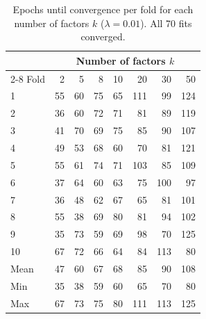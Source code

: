 	\begin{table}[ht]
		\centering
		\caption{Epochs until convergence per fold for each number of factors $k$
			($\lambda = 0.01$). All 70 fits converged.}
		\label{tab:fold-epochs}
		\begin{tabular}{@{}lrrrrrrr@{}}
			\toprule
			& \multicolumn{7}{c}{Number of factors $k$} \\
			\cmidrule(l){2-8}
			Fold & 2 & 5 & 8 & 10 & 20 & 30 & 50 \\
			\midrule
			1  &  55 &  60 & 75 & 65 & 111 &  99 & 124 \\
			2  &  36 &  60 & 72 & 71 &  81 &  89 & 119 \\
			3  &  41 &  70 & 69 & 75 &  85 &  90 & 107 \\
			4  &  49 &  53 & 68 & 60 &  70 &  81 & 121 \\
			5  &  55 &  61 & 74 & 71 & 103 &  85 & 109 \\
			6  &  37 &  64 & 60 & 63 &  75 & 100 &  97 \\
			7  &  36 &  48 & 62 & 67 &  65 &  81 & 101 \\
			8  &  55 &  38 & 69 & 80 &  81 &  94 & 102 \\
			9  &  35 &  73 & 59 & 69 &  98 &  70 & 125 \\
			10 &  67 &  72 & 66 & 64 &  84 & 113 &  80 \\
			\midrule
			Mean & 47 & 60 & 67 & 68 & 85 & 90 & 108 \\
			Min  & 35 & 38 & 59 & 60 & 65 & 70 &  80 \\
			Max  & 67 & 73 & 75 & 80 & 111 & 113 & 125 \\
			\bottomrule
		\end{tabular}
	\end{table}
	
